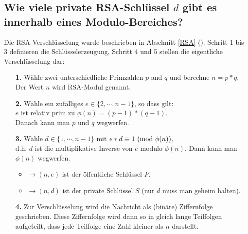 \begin{refsegment}
\subsection[Wie viele private RSA-Schlüssel d gibt es innerhalb eines Modulo-Bereiches?]
{Wie viele private RSA-Schlüs\discretionary{-}{}{}sel $d$ gibt es innerhalb eines Modulo-Be\-rei\-ches?}

\label{l:NumberTheory_Sage_Number-of-RSA-keys}{}

Die RSA-Verschlüsselung wurde beschrieben in Abschnitt \ref{RSA} (\glqq {}\grqq).
Schritt 1 bis 3 definieren die Schlüsselerzeugung, Schritt 4 und 5 stellen die
eigentliche Verschlüsselung dar:
\begin{itemize}
  \item[\textbf{1.}] Wähle zwei unterschiedliche Primzahlen $p$ and $q$
                  und berechne $n = p*q$.\\
                  Der Wert $n$ wird RSA-Modul genannt.

  \item[\textbf{2.}] Wähle ein zufälliges $e \in \{2, \cdots, n-1\}$, so dass gilt:\\
                  $e$ ist relativ prim
                  zu $\phi(n) = (p-1)*(q-1)$.\\
                  Danach kann man $p$ und $q$ \glqq wegwerfen\grqq.

  \item[\textbf{3.}] Wähle $d \in \{1, \cdots, n-1\}$ mit $e*d \equiv 1
                  {\rm ~(mod~} \phi(n))$,\\
		  d.h. $d$ ist die multiplikative Inverse von $e$ modulo $\phi(n)$.
		  Dann kann man $\phi(n)$ \glqq wegwerfen\grqq.
    \begin{itemize}[nosep,label={}]
      \item $\rightarrow (n, e)$ ist der öffentliche Schlüssel $P$.
      \item $\rightarrow (n, d)$ ist der private Schlüssel $S$ (nur $d$ muss man geheim halten).
    \end{itemize}

  \item[\textbf{4.}] Zur Verschlüsselung wird die Nachricht als (binäre) Ziffernfolge
                  geschrieben. Diese Ziffernfolge wird dann so in gleich lange
                  Teilfolgen aufgeteilt, dass jede Teilfolge eine Zahl kleiner als
                  $n$ darstellt.


\end{itemize}
\end{refsegment}
